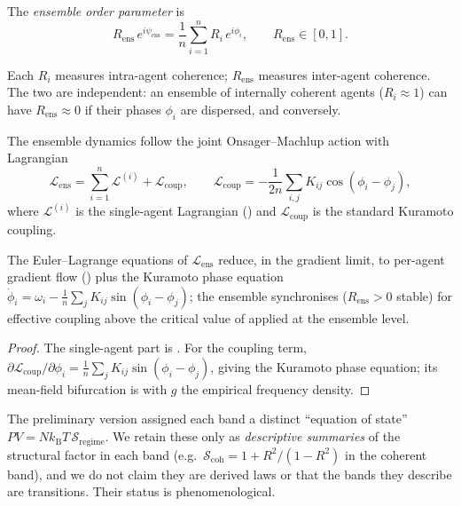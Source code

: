 \documentclass[11pt,twocolumn,a4paper]{article}
\newcommand{\Lag}{\mathcal{L}}
\newcommand{\kB}{k_{\mathrm{B}}}
\newcommand{\Ord}{R}
\begin{document}
\begin{definition}\label{def:ens-R}
The \emph{ensemble order parameter} is
\[
\Ord_{\mathrm{ens}}\,e^{i\psi_{\mathrm{ens}}}
=\frac1n\sum_{i=1}^n \Ord_i\,e^{i\phi_i},\qquad \Ord_{\mathrm{ens}}\in[0,1].
\]
\end{definition}

\begin{remark}
Each $\Ord_i$ measures intra-agent coherence; $\Ord_{\mathrm{ens}}$ measures
inter-agent coherence. The two are independent: an ensemble of internally
coherent agents ($\Ord_i\approx1$) can have $\Ord_{\mathrm{ens}}\approx0$ if
their phases $\phi_i$ are dispersed, and conversely.
\end{remark}

\begin{definition}\label{def:joint}
The ensemble dynamics follow the joint Onsager--Machlup action with Lagrangian
\[
\Lag_{\mathrm{ens}}=\sum_{i=1}^n \Lag^{(i)}+\Lag_{\mathrm{coup}},\qquad
\Lag_{\mathrm{coup}}=-\frac{1}{2n}\sum_{i,j}K_{ij}\cos(\phi_i-\phi_j),
\]
where $\Lag^{(i)}$ is the single-agent Lagrangian () and
$\Lag_{\mathrm{coup}}$ is the standard Kuramoto coupling.
\end{definition}

\begin{theorem}\label{thm:ens-sync}
The Euler--Lagrange equations of $\Lag_{\mathrm{ens}}$ reduce, in the gradient
limit, to per-agent gradient flow () plus the Kuramoto
phase equation $\dot\phi_i=\omega_i-\frac1n\sum_j K_{ij}\sin(\phi_i-\phi_j)$;
the ensemble synchronises ($\Ord_{\mathrm{ens}}>0$ stable) for effective
coupling above the critical value of  applied at the ensemble
level.
\end{theorem}

\begin{proof}
The single-agent part is . For the coupling term,
$\partial\Lag_{\mathrm{coup}}/\partial\phi_i=\frac1n\sum_j K_{ij}\sin(\phi_i-
\phi_j)$, giving the Kuramoto phase equation; its mean-field bifurcation is
 with $g$ the empirical frequency density.
\end{proof}

\begin{remark}
The preliminary version assigned each band a distinct ``equation of state''
$PV=N\kB T\,\mathcal{S}_{\mathrm{regime}}$. We retain these only as
\emph{descriptive summaries} of the structural factor in each band (e.g.\
$\mathcal{S}_{\mathrm{coh}}=1+\Ord^2/(1-\Ord^2)$ in the coherent band), and we
do not claim they are derived laws or that the bands they describe are
transitions. Their status is phenomenological.
\end{remark}
\end{document}
